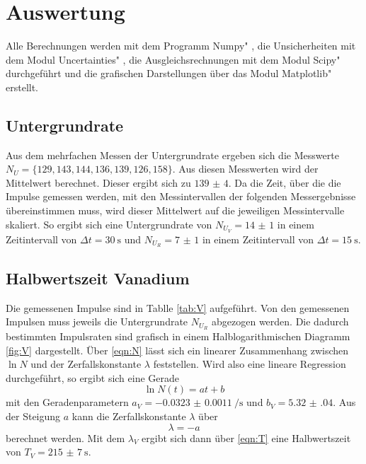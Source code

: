 \section{Auswertung}
\label{sec:Auswertung}

Alle Berechnungen werden mit dem Programm \glqq Numpy" \cite{numpy}, die Unsicherheiten mit dem Modul \glqq Uncertainties" \cite{uncertainties}, die Ausgleichsrechnungen mit dem Modul \glqq Scipy" \cite{scipy} durchgeführt und die grafischen Darstellungen über das Modul \glqq Matplotlib" \cite{matplotlib} erstellt.

\subsection{Untergrundrate}

Aus dem mehrfachen Messen der Untergrundrate ergeben sich die Messwerte $N_U=\{ 129, 143, 144, 136, 139, 126, 158 \}$. Aus diesen Messwerten wird der Mittelwert berechnet. Dieser ergibt sich zu $\num{139(4)}$. Da die Zeit, über die die Impulse gemessen werden, mit den Messintervallen der folgenden Messergebnisse übereinstimmen muss, wird  dieser Mittelwert auf die jeweiligen Messintervalle skaliert. So ergibt sich eine Untergrundrate von $N_{U_V}=\num{14(1)}$ in einem Zeitintervall von $\Delta t=\SI{30}{\s}$ und $N_{U_R}=\num{7(1)}$ in einem Zeitintervall von $\Delta t=\SI{15}{\s}$.

\subsection{Halbwertszeit Vanadium}
\label{Vanadium}

Die gemessenen Impulse sind in Tablle \ref{tab:V} aufgeführt. Von den gemessenen Impulsen muss jeweils die Untergrundrate $N_{U_R}$ abgezogen werden. Die dadurch bestimmten Impulsraten sind grafisch in einem Halblogarithmischen Diagramm \ref{fig:V} dargestellt. Über \eqref{eqn:N} lässt sich ein linearer Zusammenhang zwischen $\ln{N}$ und der Zerfallskonstante $\lambda $ feststellen. Wird also eine lineare Regression durchgeführt, so ergibt sich eine Gerade
\begin{equation}
    \ln{N}(t)=at + b
    \label{eqn:gerade}
\end{equation}
mit den Geradenparametern $a_V=\SI[per-mode=reciprocal]{-0.0323(00011)}{\per\s}$ und $b_V=\num{5.32(04)}$. 
Aus der Steigung $a$ kann die Zerfallskonstante $\lambda$ über
\begin{equation}
    \lambda=-a
\label{eqn:lamb}
\end{equation}
berechnet werden. Mit dem $\lambda_V$ ergibt sich dann über \eqref{eqn:T} eine Halbwertszeit von 
${T_V=\SI{215(7)}{\s}}$.


